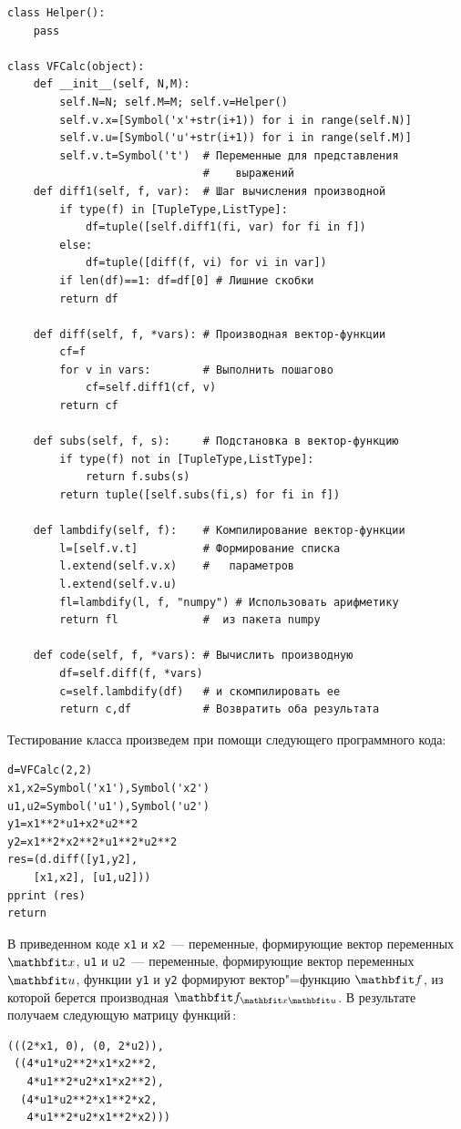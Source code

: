 \documentclass[a4paper,14pt, openany, twoside, draft]{extbook} %
\begin{document}
\begin{verbatim}
class Helper():
    pass

class VFCalc(object):
    def __init__(self, N,M):
        self.N=N; self.M=M; self.v=Helper()
        self.v.x=[Symbol('x'+str(i+1)) for i in range(self.N)]
        self.v.u=[Symbol('u'+str(i+1)) for i in range(self.M)]
        self.v.t=Symbol('t')  # Переменные для представления
                              #    выражений
    def diff1(self, f, var):  # Шаг вычисления производной
        if type(f) in [TupleType,ListType]:
            df=tuple([self.diff1(fi, var) for fi in f])
        else:
            df=tuple([diff(f, vi) for vi in var])
        if len(df)==1: df=df[0] # Лишние скобки
        return df

    def diff(self, f, *vars): # Производная вектор-функции
        cf=f
        for v in vars:        # Выполнить пошагово
            cf=self.diff1(cf, v)
        return cf

    def subs(self, f, s):     # Подстановка в вектор-функцию
        if type(f) not in [TupleType,ListType]:
            return f.subs(s)
        return tuple([self.subs(fi,s) for fi in f])

    def lambdify(self, f):    # Компилирование вектор-функции
        l=[self.v.t]          # Формирование списка
        l.extend(self.v.x)    #   параметров
        l.extend(self.v.u)
        fl=lambdify(l, f, "numpy") # Использовать арифметику
        return fl             #  из пакета numpy

    def code(self, f, *vars): # Вычислить производную
        df=self.diff(f, *vars)
        c=self.lambdify(df)   # и скомпилировать ее
        return c,df           # Возвратить оба результата
\end{verbatim}

Тестирование класса произведем при помощи следующего программного кода\;:

\begin{verbatim}
d=VFCalc(2,2)
x1,x2=Symbol('x1'),Symbol('x2')
u1,u2=Symbol('u1'),Symbol('u2')
y1=x1**2*u1+x2*u2**2
y2=x1**2*x2**2*u1**2*u2**2
res=(d.diff([y1,y2],
    [x1,x2], [u1,u2]))
pprint (res)
return
\end{verbatim}

В приведенном коде \texttt{x1} и \texttt{x2}~--- переменные, формирующие вектор переменных $\vecx$, \texttt{u1} и \texttt{u2}~--- переменные, формирующие вектор переменных $\vecu$, функции \texttt{y1} и \texttt{y2} формируют вектор"=функцию $\vecf$, из которой берется производная $\vecf_{\vecx\vecu}$.  В результате получаем следующую матрицу функций\,:
\begin{verbatim}
(((2*x1, 0), (0, 2*u2)),
 ((4*u1*u2**2*x1*x2**2,
   4*u1**2*u2*x1*x2**2),
  (4*u1*u2**2*x1**2*x2,
   4*u1**2*u2*x1**2*x2)))
\end{verbatim}
\end{document}
